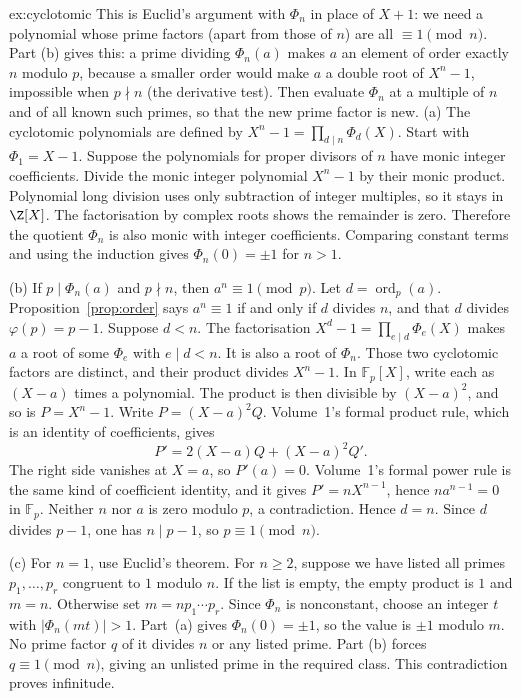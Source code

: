 \begin{solution}{ex:cyclotomic}
\idea This is Euclid's argument with $\Phi_n$ in place of $X+1$: we need a polynomial whose prime factors (apart from those of $n$) are all $\equiv1\pmod n$. Part (b) gives this: a prime dividing $\Phi_n(a)$ makes $a$ an element of order exactly $n$ modulo $p$, because a smaller order would make $a$ a double root of $X^n-1$, impossible when $p\nmid n$ (the derivative test). Then evaluate $\Phi_n$ at a multiple of $n$ and of all known such primes, so that the new prime factor is new.
\writeup (a) The cyclotomic polynomials are defined by $X^n-1=\prod_{d\mid n}\Phi_d(X)$. Start with $\Phi_1=X-1$. Suppose the polynomials for proper divisors of $n$ have monic integer coefficients. Divide the monic integer polynomial $X^n-1$ by their monic product. Polynomial long division uses only subtraction of integer multiples, so it stays in $\Z[X]$. The factorisation by complex roots shows the remainder is zero. Therefore the quotient $\Phi_n$ is also monic with integer coefficients. Comparing constant terms and using the induction gives $\Phi_n(0)=\pm1$ for $n>1$.

(b) If $p\mid\Phi_n(a)$ and $p\nmid n$, then $a^n\equiv1\pmod p$. Let $d=\operatorname{ord}_p(a)$. Proposition~\ref{prop:order} says $a^n\equiv1$ if and only if $d$ divides $n$, and that $d$ divides $\varphi(p)=p-1$. Suppose $d<n$. The factorisation $X^d-1=\prod_{e\mid d}\Phi_e(X)$ makes $a$ a root of some $\Phi_e$ with $e\mid d<n$. It is also a root of $\Phi_n$. Those two cyclotomic factors are distinct, and their product divides $X^n-1$. In $\mathbb F_p[X]$, write each as $(X-a)$ times a polynomial. The product is then divisible by $(X-a)^2$, and so is $P=X^n-1$. Write $P=(X-a)^2Q$. Volume~1's formal product rule, which is an identity of coefficients, gives
\[
P'=2(X-a)Q+(X-a)^2Q'.
\]
The right side vanishes at $X=a$, so $P'(a)=0$. Volume~1's formal power rule is the same kind of coefficient identity, and it gives $P'=nX^{n-1}$, hence $na^{n-1}=0$ in $\mathbb F_p$. Neither $n$ nor $a$ is zero modulo $p$, a contradiction. Hence $d=n$. Since $d$ divides $p-1$, one has $n\mid p-1$, so $p\equiv1\pmod n$.

(c) For $n=1$, use Euclid's theorem. For $n\ge2$, suppose we have listed all primes $p_1,\ldots,p_r$ congruent to $1$ modulo $n$. If the list is empty, the empty product is $1$ and $m=n$. Otherwise set $m=np_1\cdots p_r$. Since $\Phi_n$ is nonconstant, choose an integer $t$ with $|\Phi_n(mt)|>1$. Part~(a) gives $\Phi_n(0)=\pm1$, so the value is $\pm1$ modulo $m$. No prime factor $q$ of it divides $n$ or any listed prime. Part (b) forces $q\equiv1\pmod n$, giving an unlisted prime in the required class. This contradiction proves infinitude.
\end{solution}

